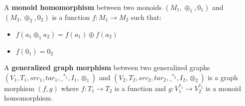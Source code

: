 \begin{definition}
  \label{Monoid-Homomorphism}
  A \textbf{monoid homomorphism} between two monoids $(M_1, \oplus_1, 0_1)$ and $(M_2, \oplus_2, 0_2)$
  is a function $f: M_1 \to M_2$ such that:
  \begin{itemize}
  \item $f(a_1 \oplus_1 a_2) = f(a_1) \oplus f(a_2)$
  \item $f (0_1) = 0_2$
  \end{itemize}
\end{definition}

\begin{definition}
  \label{Petri-net-morphism}
  A \textbf{generalized graph morphism} between two generalized graphs\\
  $(V_1, T_1, src_1, tar_1, \_^{*_1},I_1,\otimes_1)$ and
  $(V_2, T_2, src_2, tar_2, \_^{*_2},I_2,\otimes_2)$ is a graph morphism
  $(f, g)$ where $f : T_1 \to T_2$ is a function and
  $g: V_1^{*_1} \to V_2^{*_2}$ is a monoid homomorphism.
\end{definition}

